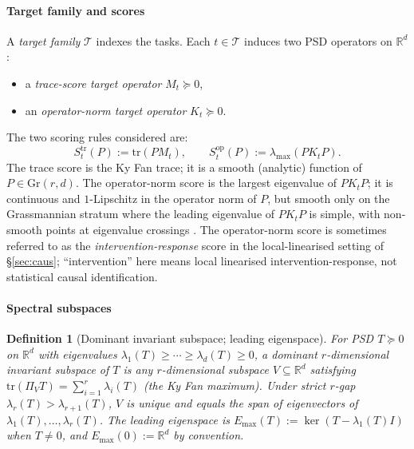 \documentclass[final,3p,times]{elsarticle}
\newtheorem{definition}[theorem]{Definition}
\newcommand{\Gr}{\mathrm{Gr}}
\newcommand{\tr}{\mathrm{tr}}
\newcommand{\R}{\mathbb{R}}
\newcommand{\Emax}{E_{\max}}
\begin{document}
\paragraph{Target family and scores}
A \emph{target family} $\mathcal{T}$ indexes the tasks.
Each $t\in\mathcal{T}$ induces two PSD operators on $\R^d$:
\begin{itemize}
\item a \emph{trace-score target operator} $M_t\succeq 0$,
\item an \emph{operator-norm target operator} $K_t\succeq 0$.
\end{itemize}
The two scoring rules considered are:
\begin{equation}\label{eq:scores}
S^{\mathrm{tr}}_t(P) := \tr(P M_t),
\qquad
S^{\mathrm{op}}_t(P) := \lambda_{\max}(P K_t P).
\end{equation}
The trace score is the Ky Fan trace; it is a smooth (analytic) function
of $P\in\Gr(r,d)$.
The operator-norm score is the largest eigenvalue of $PK_tP$; it is
continuous and $1$-Lipschitz in the operator norm of $P$, but smooth
only on the Grassmannian stratum where the leading eigenvalue of $PK_tP$
is simple, with non-smooth points at eigenvalue crossings
\cite{HornJohnson2013}.
The operator-norm score is sometimes referred to as the
\emph{intervention-response} score in the local-linearised setting of
\S\ref{sec:caus}; ``intervention'' here means local linearised
intervention-response, not statistical causal identification.

\paragraph{Spectral subspaces}
\begin{definition}[Dominant invariant subspace; leading eigenspace]
\label{def:domsubspace}
For PSD $T\succeq 0$ on $\R^d$ with eigenvalues
$\lambda_1(T)\ge\cdots\ge\lambda_d(T)\ge 0$, a \emph{dominant
$r$-dimensional invariant subspace} of $T$ is any $r$-dimensional
subspace $V\subseteq\R^d$ satisfying
$\tr(\Pi_V T)=\sum_{i=1}^r\lambda_i(T)$ (the Ky Fan maximum).
Under strict $r$-gap $\lambda_r(T)>\lambda_{r+1}(T)$, $V$ is unique and
equals the span of eigenvectors of $\lambda_1(T),\ldots,\lambda_r(T)$.
The \emph{leading eigenspace} is
$\Emax(T):=\ker(T-\lambda_1(T)I)$ when $T\ne 0$, and
$\Emax(0):=\R^d$ by convention.
\end{definition}
\end{document}
